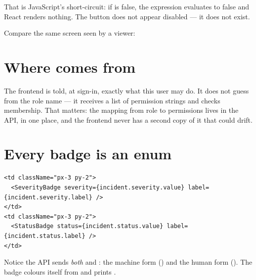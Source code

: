 That \fpath{\&\&} is JavaScript's short-circuit: if 
is false, the expression evaluates to false and React renders nothing. The
button does not appear disabled --- it does not exist.

Compare the same screen seen by a viewer:



\section{Where  comes from}

The frontend is told, at sign-in, exactly what this user may do. It does not
guess from the role name --- it receives a list of permission strings and checks
membership. That matters: the mapping from role to permissions lives in the API,
in one place, and the frontend never has a second copy of it that could drift.

\section{Every badge is an enum}

\begin{lstlisting}[language=tsx]
<td className="px-3 py-2">
  <SeverityBadge severity={incident.severity.value} label={incident.severity.label} />
</td>
<td className="px-3 py-2">
  <StatusBadge status={incident.status.value} label={incident.status.label} />
</td>
\end{lstlisting}

Notice the API sends \emph{both}  and : the machine
form () and the human form (). The badge colours
itself from  and prints .


